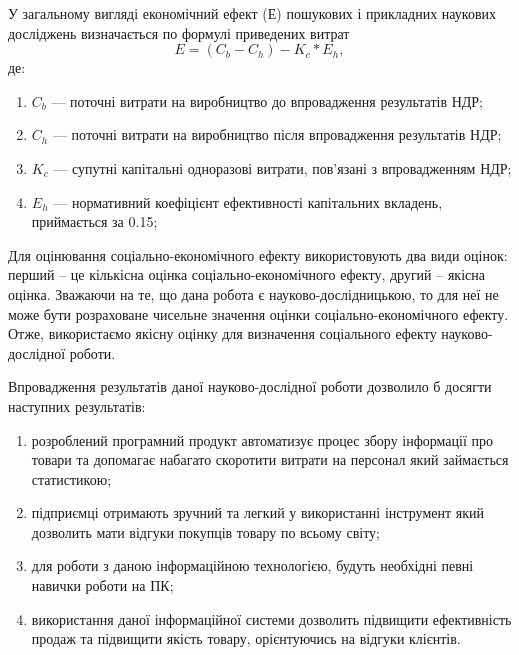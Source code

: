 У загальному вигляді економічний ефект ($Е$) пошукових і прикладних наукових досліджень визначається по формулі приведених витрат
\begin{equation}
E = (C_b - C_h) - K_c * E_h,
\end{equation}
де:
\begin{enumerate}
\item $C_b$ --- поточні витрати на виробництво до впровадження результатів НДР;
\item $C_h$ --- поточні витрати на виробництво після впровадження результатів НДР;
\item $K_c$ --- супутні капітальні одноразові витрати, пов'язані з впровадженням НДР;
\item $E_h$ --- нормативний коефіцієнт ефективності капітальних вкладень, приймається за 0.15;
\end{enumerate}

Для оцінювання соціально-економічного ефекту використовують два види оцінок: перший – це кількісна оцінка соціально-економічного ефекту, другий – якісна оцінка. Зважаючи на те, що дана робота є науково-дослідницькою, то для неї не може бути розраховане чисельне значення оцінки соціально-економічного ефекту. Отже, використаємо якісну оцінку для визначення соціального ефекту науково-дослідної роботи.

Впровадження результатів даної науково-дослідної роботи дозволило б досягти наступних результатів:
\begin{enumerate}
\item розроблений програмний продукт автоматизує процес збору інформації про товари та допомагає набагато скоротити витрати на персонал який займається статистикою;
\item підприємці отримають зручний та легкий у використанні інструмент який дозволить мати відгуки покупців товару по всьому світу;
\item для роботи з даною інформаційною технологією, будуть необхідні певні навички роботи на ПК;
\item використання даної інформаційної системи дозволить підвищити ефективність продаж та підвищити якість товару, орієнтуючись на відгуки клієнтів.
\end{enumerate}
